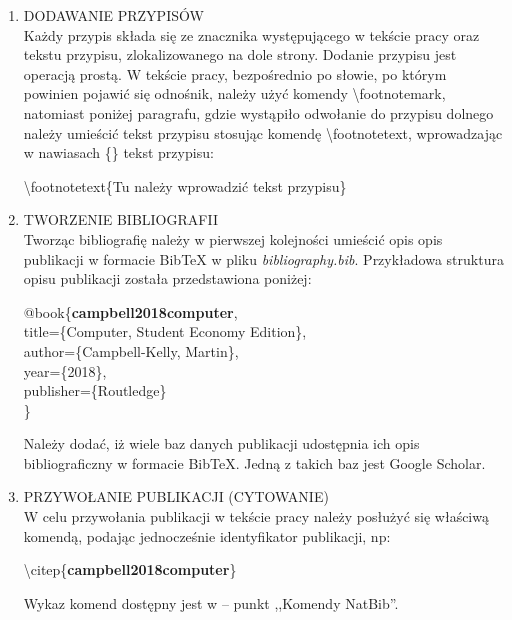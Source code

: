 \begin{enumerate}
	Formula matematyczna jest wtedy automatycznie numerowana. Unikalny identyfikator w komendzie \textbackslash label\{\} pozwala na przywołanie wzoru w tekście pracy, stosując komendę \textbackslash ref\{\}, np.
	
	(\ldots) pole trapezu (\textbackslash ref\{\textbf{eq:trapez}\}) wyznaczane jest (\ldots)
		
	Należy dodać, iż w Internecie dostępnych jest wiele narzędzi wspierających tworzenie wzorów w języku \LaTeX, np:
	
	\url{https://www.codecogs.com/latex/eqneditor.php}
			
	\item DODAWANIE PRZYPISÓW\\
	Każdy przypis składa się ze znacznika występującego w tekście pracy oraz tekstu przypisu, zlokalizowanego na dole strony. Dodanie przypisu jest operacją prostą. W tekście pracy, bezpośrednio po słowie, po którym powinien pojawić się odnośnik, należy użyć komendy \textbackslash footnotemark, natomiast poniżej paragrafu, gdzie wystąpiło odwołanie do przypisu dolnego należy umieścić tekst przypisu stosując komendę \textbackslash footnotetext, wprowadzając w nawiasach \{\} tekst przypisu:
	
	\textbackslash footnotetext\{Tu należy wprowadzić tekst przypisu\}
	
	\item TWORZENIE BIBLIOGRAFII\\
	Tworząc bibliografię należy w pierwszej kolejności umieścić opis opis publikacji w formacie BibTeX w pliku \textit{bibliography.bib}. Przykładowa struktura opisu publikacji została przedstawiona poniżej:
	
	@book\{\textbf{campbell2018computer},\\
		title=\{Computer, Student Economy Edition\},\\
		author=\{Campbell-Kelly, Martin\},\\
		year=\{2018\},\\
		publisher=\{Routledge\}\\
	\}
	
	Należy dodać, iż wiele baz danych publikacji udostępnia ich opis bibliograficzny w formacie BibTeX. Jedną z takich baz jest Google Scholar.
	
	\item PRZYWOŁANIE PUBLIKACJI (CYTOWANIE)\\
	W celu przywołania publikacji w tekście pracy należy posłużyć się właściwą komendą, podając jednocześnie identyfikator publikacji, np:
	
	\textbackslash citep\{\textbf{campbell2018computer}\}
	
	Wykaz komend dostępny jest w \cite{website:wikibooks} -- punkt ,,Komendy NatBib''.
	
\end{enumerate}

